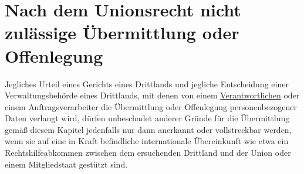 \chapter{Nach dem Unionsrecht nicht zulässige Übermittlung oder Offenlegung}
\label{ch:48}


Jegliches Urteil eines Gerichts eines Drittlands und jegliche Entscheidung einer Verwaltungsbehörde eines Drittlands,
mit denen von einem \hyperref[itm:04-7]{Verantwortlichen} oder einem Auftragsverarbeiter die Übermittlung oder Offenlegung personenbezogener
Daten verlangt wird, dürfen unbeschadet anderer Gründe für die Übermittlung gemäß diesem Kapitel jedenfalls nur dann
anerkannt oder vollstreckbar werden, wenn sie auf eine in Kraft befindliche internationale Übereinkunft wie etwa ein
Rechtshilfeabkommen zwischen dem ersuchenden Drittland und der Union oder einem Mitgliedstaat gestützt sind.


